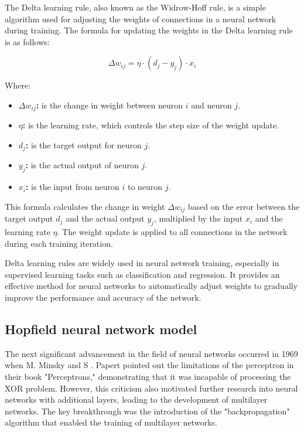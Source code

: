 \documentclass[paper=a4, fontsize=11pt]{scrartcl} %
\numberwithin{equation}{section} %
\numberwithin{figure}{section} %
\numberwithin{table}{section} %
\begin{document}
The Delta learning rule, also known as the Widrow-Hoff rule, is a simple algorithm used for adjusting the weights of connections in a neural network during training. The formula for updating the weights in the Delta learning rule is as follows:

\[ \Delta w_{ij} = \eta \cdot (d_j - y_j) \cdot x_i \]

Where:

\begin{itemize}
    \item \textbf{ $\Delta w_{ij}$:} is the change in weight between neuron \( i \) and neuron \( j \).
    \item \textbf{$\eta $:} is the learning rate, which controls the step size of the weight update.
    \item \textbf{ $d_{j}$:} is the target output for neuron \( j \).
    \item \textbf{$y_j$:} is the actual output of neuron \( j \).
    \item \textbf{$x_i$:} is the input from neuron \( i \) to neuron \( j \).
\end{itemize}

This formula calculates the change in weight \( \Delta w_{ij} \) based on the error between the target output \( d_j \) and the actual output \( y_j \), multiplied by the input \( x_i \) and the learning rate \( \eta \). The weight update is applied to all connections in the network during each training iteration.


Delta learning rules are widely used in neural network training, especially in supervised learning tasks such as classification and regression. It provides an effective method for neural networks to automatically adjust weights to gradually improve the performance and accuracy of the network.






\subsection{Hopfield neural network model}
The next significant advancement in the field of neural networks occurred in 1969 when M. Minsky and S \cite{JJHopfield1982NeuralNetworksPhysical}. Papert pointed out the limitations of the perceptron in their book "Perceptrons," demonstrating that it was incapable of processing the XOR problem. However, this criticism also motivated further research into neural networks with additional layers, leading to the development of multilayer networks. The key breakthrough was the introduction of the "backpropagation" algorithm that enabled the training of multilayer networks.
\end{document}
